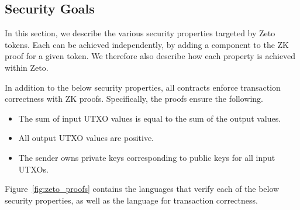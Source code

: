 \subsection{Security Goals}


In this section, we describe the various security properties targeted by Zeto tokens. Each can be achieved independently, by adding a component to the ZK proof for a given token. We therefore also describe how each property is achieved within Zeto.

In addition to the below security properties, all contracts enforce transaction correctness with ZK proofs. Specifically, the proofs ensure the following.
\begin{itemize}
  \item The sum of input UTXO values is equal to the sum of the output values.
  \item All output UTXO values are positive.
  \item The sender owns private keys corresponding to public keys for all input UTXOs.
\end{itemize}

Figure~\ref{fig:zeto_proofs} contains the languages that verify each of the below security properties, as well as the language for transaction correctness.

